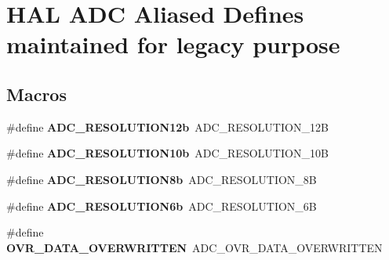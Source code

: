 \hypertarget{group___h_a_l___a_d_c___aliased___defines}{}\section{H\+AL A\+DC Aliased Defines maintained for legacy purpose}
\label{group___h_a_l___a_d_c___aliased___defines}
\subsection*{Macros}
\begin{DoxyCompactItemize}
\item 
\#define {\bfseries A\+D\+C\+\_\+\+R\+E\+S\+O\+L\+U\+T\+I\+O\+N12b}~A\+D\+C\+\_\+\+R\+E\+S\+O\+L\+U\+T\+I\+O\+N\+\_\+12B\hypertarget{group___h_a_l___a_d_c___aliased___defines_ga6d328c588ea6f273ca698d48441a2a71}{}\label{group___h_a_l___a_d_c___aliased___defines_ga6d328c588ea6f273ca698d48441a2a71}

\item 
\#define {\bfseries A\+D\+C\+\_\+\+R\+E\+S\+O\+L\+U\+T\+I\+O\+N10b}~A\+D\+C\+\_\+\+R\+E\+S\+O\+L\+U\+T\+I\+O\+N\+\_\+10B\hypertarget{group___h_a_l___a_d_c___aliased___defines_gaa695d7ca46602fd4317d5f6a7a2ee071}{}\label{group___h_a_l___a_d_c___aliased___defines_gaa695d7ca46602fd4317d5f6a7a2ee071}

\item 
\#define {\bfseries A\+D\+C\+\_\+\+R\+E\+S\+O\+L\+U\+T\+I\+O\+N8b}~A\+D\+C\+\_\+\+R\+E\+S\+O\+L\+U\+T\+I\+O\+N\+\_\+8B\hypertarget{group___h_a_l___a_d_c___aliased___defines_ga96b87d1645b3ae2e4af88daa006decc4}{}\label{group___h_a_l___a_d_c___aliased___defines_ga96b87d1645b3ae2e4af88daa006decc4}

\item 
\#define {\bfseries A\+D\+C\+\_\+\+R\+E\+S\+O\+L\+U\+T\+I\+O\+N6b}~A\+D\+C\+\_\+\+R\+E\+S\+O\+L\+U\+T\+I\+O\+N\+\_\+6B\hypertarget{group___h_a_l___a_d_c___aliased___defines_gaeaba9f99d20e7305507044f975925622}{}\label{group___h_a_l___a_d_c___aliased___defines_gaeaba9f99d20e7305507044f975925622}

\item 
\#define {\bfseries O\+V\+R\+\_\+\+D\+A\+T\+A\+\_\+\+O\+V\+E\+R\+W\+R\+I\+T\+T\+EN}~A\+D\+C\+\_\+\+O\+V\+R\+\_\+\+D\+A\+T\+A\+\_\+\+O\+V\+E\+R\+W\+R\+I\+T\+T\+EN\hypertarget{group___h_a_l___a_d_c___aliased___defines_ga46d2fd3222a716456b74ad881eb34039}{}\label{group___h_a_l___a_d_c___aliased___defines_ga46d2fd3222a716456b74ad881eb34039}


\end{DoxyCompactItemize}
